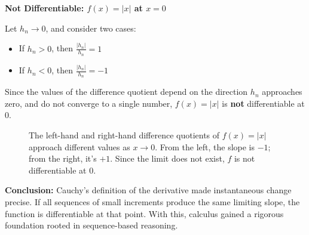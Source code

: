     
  

\textbf{Not Differentiable: \( f(x) = |x| \) at \( x = 0 \)}  

    Let \( h_n \to 0 \), and consider two cases:

    \begin{itemize}
        \item If \( h_n > 0 \), then \( \frac{|h_n|}{h_n} = 1 \)
        \item If \( h_n < 0 \), then \( \frac{|h_n|}{h_n} = -1 \)
    \end{itemize}

    Since the values of the difference quotient depend on the direction \( h_n \) approaches zero, and do not converge to a single number, \( f(x) = |x| \) is \textbf{not} differentiable at 0.




\begin{figure}[H]
\centering
{}
\caption{
The left-hand and right-hand difference quotients of \( f(x) = |x| \) approach different values as \( x \to 0 \). From the left, the slope is \(-1\); from the right, it’s \(+1\). Since the limit does not exist, \( f \) is not differentiable at 0.
}
\end{figure}






\textbf{Conclusion:} Cauchy’s definition of the derivative made instantaneous change precise. If all sequences of small increments produce the same limiting slope, the function is differentiable at that point. With this, calculus gained a rigorous foundation rooted in sequence-based reasoning.


